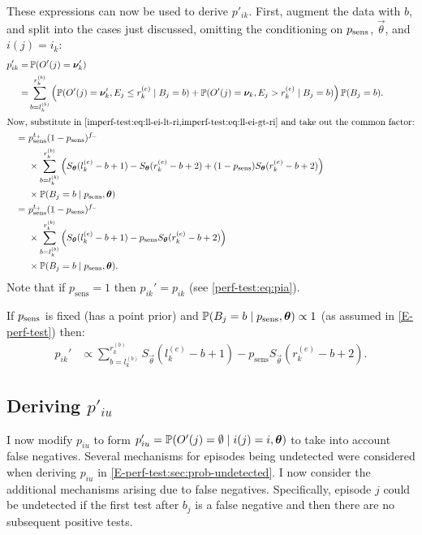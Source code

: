 \documentclass[thesis.tex]{subfiles}
\begin{document}
These expressions can now be used to derive $p'_{ik}$.
First, augment the data with $b$, and split into the cases just discussed, omitting the conditioning on $p_\text{sens}$, $\vec{\theta}$, and $i(j) = i_k$:
\begin{align}
p_{ik}'
=& \prob(O'(j) = \vec{\nu}_k') \\
=& \sum_{b = l_k^{(b)}}^{r_k^{(b)}} \left( \prob(O'(j) = \vec{\nu}_k', E_j \leq r_k^{(e)} \mid B_j = b) + \prob(O'(j) = \vec{\nu}_k, E_j > r_k^{(e)} \mid B_j = b) \right) \prob(B_j = b). \\
\intertext{Now, substitute in \cref{imperf-test:eq:ll-ei-lt-ri,imperf-test:eq:ll-ei-gt-ri} and take out the common factor:}
=\ &  p_\text{sens}^{t_+} (1 - p_\text{sens})^{f_-} \\
 & \times \sum_{b = l_k^{(b)}}^{r_k^{(b)}} \left( S_{\vec{\theta}}(l_k^{(e)} - b + 1) - S_{\vec{\theta}}(r_k^{(e)} - b + 2) + (1 - p_\text{sens}) S_{\vec{\theta}}(r_k^{(e)} - b + 2) \right) \\ 
  & \times \prob(B_j = b \mid p_\text{sens}, \vec{\theta}) \\
=\ &  p_\text{sens}^{t_+} (1 - p_\text{sens})^{f_-} \\
  & \times \sum_{b = l_k^{(b)}}^{r_k^{(b)}} \left( S_{\vec{\theta}}(l_k^{(e)} - b + 1) - p_\text{sens} S_{\vec{\theta}}(r_k^{(e)} - b + 2) \right) \\
  & \times \prob(B_j = b \mid p_\text{sens}, \vec{\theta}).
\label{imperf-test:eq:pia-prime}
\end{align}
Note that if $p_\text{sens} = 1$ then $p_{ik}' = p_{ik}$ (see \cref{perf-test:eq:pia}).

If $p_\text{sens}$ is fixed (\ie has a point prior) and $\operatorname{\mathbb{P}}(B_j = b \mid p_\text{sens}, \bm{\theta}) \propto 1$ (as assumed in \cref{E-perf-test}) then:
\begin{align}
p_{ik}'
&\propto \sum_{b = l_k^{(b)}}^{r_k^{(b)}} S_{\vec{\theta}}(l_k^{(e)} - b + 1) - p_\text{sens} S_{\vec{\theta}}(r_k^{(e)} - b + 2).
\label{imperf-test:eq:pia-prime-constant}
\end{align}

\subsection{Deriving $p'_{iu}$} \label{imperf-test:sec:modifying-p_iu}

I now modify $p_{iu}$ to form $p_{iu}' = \operatorname{\mathbb{P}}(O'(j) = \emptyset \mid i(j) = i, \bm{\theta})$ to take into account false negatives.
Several mechanisms for episodes being undetected were considered when deriving $p_{iu}$ in \cref{E-perf-test:sec:prob-undetected}.
I now consider the additional mechanisms arising due to false negatives.
Specifically, episode $j$ could be undetected if the first test after $b_j$ is a false negative and then there are no subsequent positive tests.
\end{document}
